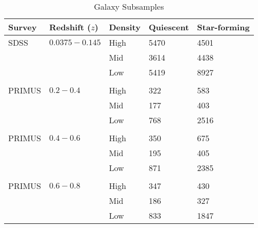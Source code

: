 \documentclass{emulateapj}
\begin{document}
\begin{table} %
  \caption{Galaxy Subsamples}
  \label{tab:subsample}
  \begin{center}
    \leavevmode
    \begin{tabular}{lllll} \hline \hline              
  Survey    &Redshift ($z$) &Density        &Quiescent  &Star-forming  \\ \hline 
  SDSS      &$0.0375-0.145$ &High           &5470                       &4501                           \\
            &               &Mid            &3614                       &4438                           \\
            &               &Low            &5419                       &8927                           \\
            &               &               &                       &                           \\ \hline
  PRIMUS    &$0.2-0.4$      &High           &322                    &583                           \\
            &               &Mid            &177                    &403                          \\
            &               &Low            &768                    &2516                           \\
            &               &               &                       &                           \\ \hline
  PRIMUS    &$0.4-0.6$      &High           &350                       &675                           \\
            &               &Mid            &195                       &405                           \\
            &               &Low            &871                       &2385                           \\
            &               &               &                       &                           \\ \hline
  PRIMUS    &$0.6-0.8$      &High           &347                       &430                           \\
            &               &Mid            &186                       &327                           \\
            &               &Low            &833                       &1847                           \\

\end{tabular}
\end{center}
\end{table}
\end{document}
